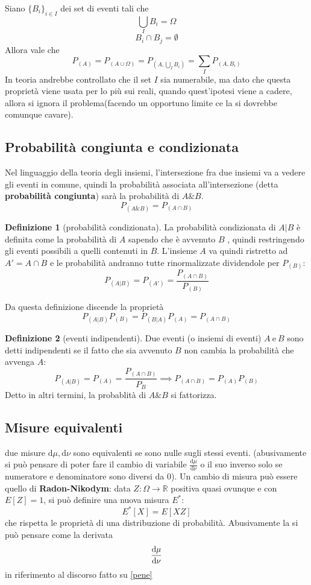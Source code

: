 \documentclass[a4paper,12pt]{article}
\renewcommand{\arg}[1]{_{(#1)}}
\theoremstyle{plain}
\theoremstyle{definition}
\newtheorem{defn}{Definizione}[section]
\newcommand{\f}[2]{\frac{#1}{#2}}
\renewcommand{\d}{\text{d}}
\newcommand{\econg}{~\text{e}~}
\newcommand{\gw}[1]{\arg{#1}}
\newcommand{\ra}{\rightarrow}
\theoremstyle{remark}
\begin{document}
\begin{obs}\label{abuso1}
Siano $\{B_i\}_{i\in I }$ dei set di eventi tali che \[\bigcup_{I} B_i=\Omega\]
\[B_i\cap B_j=\emptyset\]
Allora vale che 
\[P\arg{A}=P\arg{A\cup\Omega}=P\gw{A,\bigcup_IB_i}=\sum_I P\gw{A,B_i}\]
In teoria andrebbe controllato che il set $I$ sia numerabile, ma dato che questa proprietà viene usata per lo più sui reali, quando quest'ipotesi viene a cadere, allora si ignora il problema(facendo un opportuno limite ce la si dovrebbe comunque cavare).

\end{obs}
	
	\subsection{Probabilità congiunta e condizionata}
	Nel linguaggio della teoria degli insiemi, l'intersezione fra due insiemi va a vedere gli eventi in comune, quindi la  probabilità associata all'intersezione (detta \textbf{probabilità congiunta}) sarà la probabilità di $A \& B$.
	\[P\arg{A \& B}=P\arg{A\cap B}\]
	\begin{defn}[probabilità condizionata]
	La probabilità condizionata di $A|B$ è definita come la probabilità di $A$ sapendo che è avvenuto $B$ , quindi restringendo gli eventi possibili a quelli contenuti in $B$. L'insieme $A$ va quindi ristretto ad $A'=A\cap B$ e le probabilità andranno tutte rinormalizzate dividendole per $P\arg{B}$:
	\[P\arg{A|B}=P\arg{A'}=\frac{P\arg{A\cap B}}{P\arg{B}}\]
		
	\end{defn}
	Da questa definizione discende la proprietà
	\[P\arg{A|B} P\arg{B}=P\arg{B|A}P\arg{A}=P\arg{A\cap B}\]
	\begin{defn}[eventi indipendenti]
		Due eventi (o insiemi di eventi) $A\econg B$ sono detti indipendenti se il fatto che sia avvenuto $B$ non cambia la probabilità che avvenga $A$:
		\[P\arg{A|B}=P\arg{A}=\f{P\arg{A\cap B}}{P_B}\implies P\arg{A\cap B}=P\arg{A}P\arg{B}		\]
Detto in altri termini, la probablità di $A\&B$ si fattorizza.	
\end{defn}
\subsection{Misure equivalenti}
due misure $\d \mu,\d \nu$ sono equivalenti se sono nulle sugli stessi eventi. (abusivamente si può pensare di poter fare il cambio di variabile $\f{\d \mu}{\d \nu}$ o il suo inverso solo se numeratore e denominatore sono diversi da 0). Un cambio di misura può essere quello di \textbf{Radon-Nikodym}: data $Z:\Omega\ra \mathbb{R}$ positiva quasi ovunque e con $E[{Z}]=1$, si può definire una nuova misura $E^*$:
\[E^*[X]=E[XZ]\]
che rispetta le proprietà di una distribuzione di probabilità. Abusivamente la si può pensare come la derivata
\[\dv{\mu}{\nu}\]
in riferimento al discorso fatto su \ref{pene}
\end{document}
